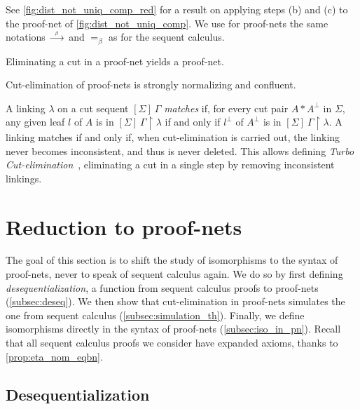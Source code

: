 \documentclass{lmcs}
\newcommand*{\orth}{^\perp} %
\newcommand*{\eqeq}{=} %
\newcommand{\symboltext}[2]{\mathrel{\overset{\makebox[0pt]{\mbox{\normalfont\tiny\sffamily \ensuremath{#1}}}}{#2}}} %
\newcommand{\betato}{\symboltext{\beta}{\longrightarrow}}
\newcommand{\eqb}{\mathrel{\eqeq_{\beta}}}
\begin{document}
See \autoref{fig:dist_not_uniq_comp_red} for a result on applying steps (b) and (c) to the proof-net of \autoref{fig:dist_not_uniq_comp}.
We use for proof-nets the same notations $\betato$ and $\eqb$ as for the sequent calculus.

\begin{propC}
\label{prop:cut_elim_correct}
Eliminating a cut in a proof-net yields a proof-net.
\end{propC}

\begin{thmC}
\label{th:cut_sn}
Cut-elimination of proof-nets is strongly normalizing and confluent.
\end{thmC}

A linking $\lambda$ on a cut sequent $[\Sigma]~\Gamma$ \emph{matches} if, for every cut pair $A\ast A\orth$ in $\Sigma$, any given leaf $l$ of $A$ is in $[\Sigma]~\Gamma\upharpoonright\lambda$ if and only if $l\orth$ of $A\orth$ is in $[\Sigma]~\Gamma\upharpoonright\lambda$.
A linking matches if and only if, when cut-elimination is carried out, the linking never becomes inconsistent, and thus is never deleted.
This allows defining \emph{Turbo Cut-elimination}~\cite{mallpnlong}, eliminating a cut in a single step by removing inconsistent linkings.


\section{Reduction to proof-nets}
\label{sec:red_pn}

The goal of this section is to shift the study of isomorphisms to the syntax of proof-nets, never to speak of sequent calculus again.
We do so by first defining \emph{desequentialization}, a function from sequent calculus proofs to proof-nets (\autoref{subsec:deseq}).
We then show that cut-elimination in proof-nets simulates the one from sequent calculus (\autoref{subsec:simulation_th}).
Finally, we define isomorphisms directly in the syntax of proof-nets (\autoref{subsec:iso_in_pn}).
Recall that all sequent calculus proofs we consider have expanded axioms, thanks to \autoref{prop:eta_nom_eqbn}.

\subsection{Desequentialization}
\label{subsec:deseq}
\end{document}
